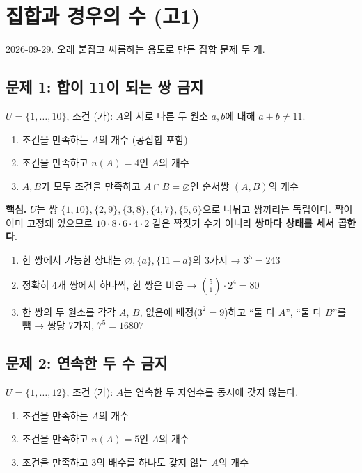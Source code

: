 \section{집합과 경우의 수 (고1)}

2026-09-29. 오래 붙잡고 씨름하는 용도로 만든 집합 문제 두 개.

\subsection{문제 1: 합이 11이 되는 쌍 금지}

\(U=\{1,\dots,10\}\), 조건 (가): \(A\)의 서로 다른 두 원소 \(a,b\)에
대해 \(a+b\ne11\).

\begin{enumerate}
\def\labelenumi{\arabic{enumi}.}
\tightlist
\item
  조건을 만족하는 \(A\)의 개수 (공집합 포함)
\item
  조건을 만족하고 \(n(A)=4\)인 \(A\)의 개수
\item
  \(A,B\)가 모두 조건을 만족하고 \(A\cap B=\varnothing\)인 순서쌍
  \((A,B)\)의 개수
\end{enumerate}

\textbf{핵심.} \(U\)는 쌍
\(\{1,10\},\{2,9\},\{3,8\},\{4,7\},\{5,6\}\)으로 나뉘고 쌍끼리는
독립이다. 짝이 이미 고정돼 있으므로 \(10\cdot8\cdot6\cdot4\cdot2\) 같은
짝짓기 수가 아니라 \textbf{쌍마다 상태를 세서 곱한다}.

\begin{enumerate}
\def\labelenumi{\arabic{enumi}.}
\tightlist
\item
  한 쌍에서 가능한 상태는 \(\varnothing,\{a\},\{11-a\}\)의 3가지 →
  \(3^5=243\)
\item
  정확히 4개 쌍에서 하나씩, 한 쌍은 비움 → \(\binom51\cdot2^4=80\)
\item
  한 쌍의 두 원소를 각각 \(A\), \(B\), 없음에 배정(\(3^2=9\))하고 ``둘
  다 \(A\)'', ``둘 다 \(B\)''를 뺌 → 쌍당 7가지, \(7^5=16807\)
\end{enumerate}

\subsection{문제 2: 연속한 두 수 금지}

\(U=\{1,\dots,12\}\), 조건 (가): \(A\)는 연속한 두 자연수를 동시에 갖지
않는다.

\begin{enumerate}
\def\labelenumi{\arabic{enumi}.}
\tightlist
\item
  조건을 만족하는 \(A\)의 개수
\item
  조건을 만족하고 \(n(A)=5\)인 \(A\)의 개수
\item
  조건을 만족하고 3의 배수를 하나도 갖지 않는 \(A\)의 개수
\end{enumerate}

